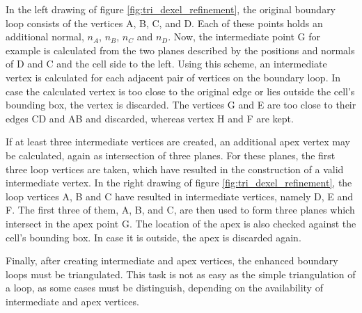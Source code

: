 In the left drawing of figure \ref{fig:tri_dexel_refinement}, the original boundary loop consists of the vertices A, B, C, and D.
Each of these points holds an additional normal, $n_A$, $n_B$, $n_C$ and $n_D$.
Now, the intermediate point G for example is calculated from the two planes described by the positions and normals of D and C and the cell side to the left.
Using this scheme, an intermediate vertex is calculated for each adjacent pair of vertices on the boundary loop.
In case the calculated vertex is too close to the original edge or lies outside the cell's bounding box, the vertex is discarded.
The vertices G and E are too close to their edges CD and AB and discarded, whereas vertex H and F are kept.

If at least three intermediate vertices are created, an additional apex vertex may be calculated, again as intersection of three planes.
For these planes, the first three loop vertices are taken, which have resulted in the construction of a valid intermediate vertex.
In the right drawing of figure \ref{fig:tri_dexel_refinement}, the loop vertices A, B and C have resulted in intermediate vertices, namely D, E and F.
The first three of them, A, B, and C, are then used to form three planes which intersect in the apex point G.
The location of the apex is also checked against the cell's bounding box.
In case it is outside, the apex is discarded again.

Finally, after creating intermediate and apex vertices, the enhanced boundary loops must be triangulated.
This task is not as easy as the simple triangulation of a loop, as some cases must be distinguish, depending on the availability of intermediate and apex vertices.

